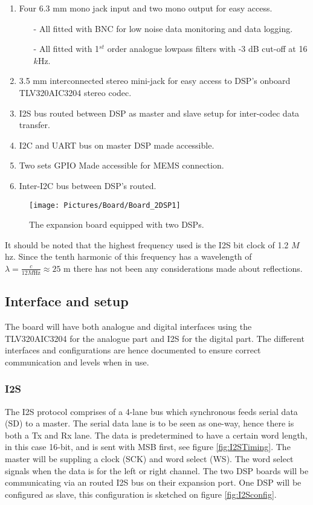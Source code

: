 \begin{enumerate}
	\item Four 6.3 mm mono jack input and two mono output for easy access.
	\begin{itemize}
		\item[-] All fitted with BNC for low noise data monitoring and data logging.
		\item[-] All fitted with 1$^{st}$ order analogue lowpass filters with -3 dB cut-off at 16 $k$Hz.
	\end{itemize}
	\item 3.5 mm interconnected stereo mini-jack for easy access to DSP's onboard TLV320AIC3204 stereo codec.
	\item I2S bus routed between DSP as master and slave setup for inter-codec data transfer.
	\item I2C and UART bus on master DSP made accessible.
	\item Two sets GPIO Made accessible for MEMS connection.
	\item Inter-I2C bus between DSP's routed. 
\end{enumerate}

\begin{figure}[H]
	\centering
	\texttt{[image: Pictures/Board/Board\_2DSP1]}	
	\caption{The expansion board equipped with two DSPs.}
	\label{fig:PCBboard}
\end{figure}

It should be noted that the highest frequency used is the I2S bit clock of 1.2 $M$hz. Since the tenth harmonic of this frequency has a wavelength of $\lambda=\frac{c}{12M \text{Hz}}\approx25\text{ m}$ there has not been any considerations made about reflections.


\subsection{Interface and setup}\label{subsec:Interface}

The board will have both analogue and digital interfaces using the TLV320AIC3204 for the analogue part and I2S for the digital part. The different interfaces and configurations are hence documented to ensure correct communication and levels when in use. 

\subsubsection*{I2S}

The I2S protocol comprises of a 4-lane bus which synchronous feeds serial data (SD) to a master. The serial data lane is to be seen as one-way, hence there is both a Tx and Rx lane. The data is predetermined to have a certain word length, in this case 16-bit, and is sent with MSB first, see figure \ref{fig:I2STiming}. The master will be suppling a clock (SCK) and word select (WS). The word select signals when the data is for the left or right channel. The two DSP boards will be communicating via an routed I2S bus on their expansion port. One DSP will be configured as slave, this configuration is sketched on figure \ref{fig:I2Sconfig}. 

